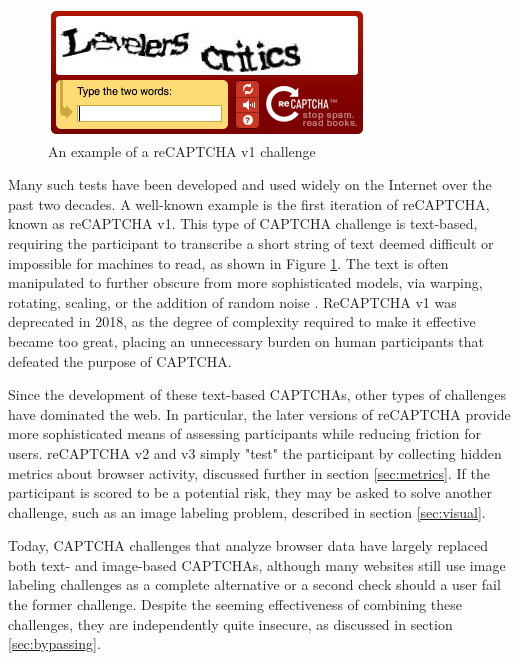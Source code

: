\documentclass[sigplan,screen,nonacm]{acmart-tagged}
\begin{document}
\begin{figure}[h]
\centering
\includegraphics[width=1\linewidth]{resources/v1}
\caption{An example of a reCAPTCHA v1 challenge}
\label{fig:v1}
\end{figure}

Many such tests have been developed and used widely on the Internet over the past two decades. A well-known example is the first iteration of reCAPTCHA, known as reCAPTCHA v1. This type of CAPTCHA challenge is text-based, requiring the participant to transcribe a short string of text deemed difficult or impossible for machines to read, as shown in Figure \ref{fig:v1}. The text is often manipulated to further obscure from more sophisticated models, via warping, rotating, scaling, or the addition of random noise \cite{recaptcha}. ReCAPTCHA v1 was deprecated in 2018, as the degree of complexity required to make it effective became too great, placing an unnecessary burden on human participants that defeated the purpose of CAPTCHA.

Since the development of these text-based CAPTCHAs, other types of challenges have dominated the web. In particular, the later versions of reCAPTCHA provide more sophisticated means of assessing participants while reducing friction for users. reCAPTCHA v2 and v3 simply "test" the participant by collecting hidden metrics about browser activity, discussed further in section \ref{sec:metrics}. If the participant is scored to be a potential risk, they may be asked to solve another challenge, such as an image labeling problem, described in section \ref{sec:visual}.

Today, CAPTCHA challenges that analyze browser data have largely replaced both text- and image-based CAPTCHAs, although many websites still use image labeling challenges as a complete alternative or a second check should a user fail the former challenge. Despite the seeming effectiveness of combining these challenges, they are independently quite insecure, as discussed in section \ref{sec:bypassing}.
\end{document}
